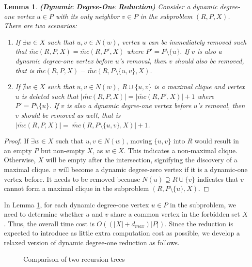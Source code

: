 \documentclass[sigconf, nonacm]{acmart}
\newtheorem{lem}[thm]{\bf Lemma}
\begin{document}
{\begin{lem}{\textbf{(Dynamic Degree-One Reduction)}} 
Consider a dynamic degree-one vertex $u\in P$ with its only neighbor $v\in P$ in the subproblem $(R,P,X)$. There are two scenarios: 
\begin{enumerate} 
    \item If $\exists w \in X$ such that $u, v \in N(w)$, vertex $u$ can be immediately removed such that $\tilde{mc}(R,P,X)=\tilde{mc}(R,P',X)$ where $P'=P\setminus \{u\}$. If $v$ is also a dynamic degree-one vertex before $u$'s removal, then $v$ should also be removed, that is $\tilde{mc}(R,P,X)=\tilde{mc}(R,P\setminus\{u,v\}, X)$. 
    \item If $\nexists w \in X$ such that $u, v \in N(w)$, $R\cup\{u,v\}$ is a maximal clique and vertex $u$ is deleted such that $\lvert\tilde{mc}(R,P,X)\rvert=\lvert\tilde{mc}(R,P',X)\rvert + 1$ where $P'=P\setminus \{u\}$. If $v$ is also a dynamic degree-one vertex before $u$'s removal, then $v$ should be removed as well, that is $\lvert\tilde{mc}(R,P,X)\rvert=\lvert\tilde{mc}(R,P\setminus \{u,v\},X)\rvert + 1$. 
\end{enumerate}
\label{lemma5}
\end{lem}
\begin{proof}
    If $\exists w \in X$ such that $u, v \in N(w)$, moving $\{u,v\}$ into $R$ would result in an empty $P$ but non-empty $X$, as $w \in X$. This indicates a non-maximal clique. Otherwise, $X$ will be empty after the intersection, signifying the discovery of a maximal clique. $v$ will become a dynamic degree-zero vertex if it is a dynamic-one vertex before. It needs to be removed because $N(u)\supseteq R\cup\{v\}$ indicates that $v$ cannot form a maximal clique in the subproblem $(R,P\setminus\{u\},X)$.
\end{proof}
}

In Lemma \ref{lemma5}, for each dynamic degree-one vertex $u \in P$ in the subproblem, we need to determine whether $u$ and $v$ share a common vertex in the forbidden set $X$. Thus, the overall time cost is $O((\lvert X\rvert + d_{max} )\lvert P\rvert)$.  Since the reduction is expected to introduce as little extra computation cost as possible, we develop a relaxed version of dynamic degree-one reduction as follows.

\begin{figure}[t]
    \centering
    \hfil
    \vspace{-0.15in}
    \caption{Comparison of two recursion trees}
    \label{fig4}
    \vspace{-0.05in}
\end{figure}
\end{document}
